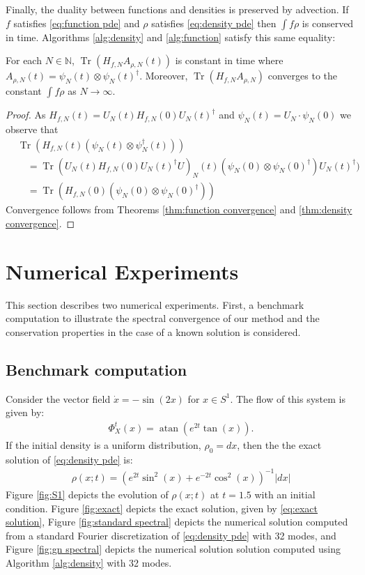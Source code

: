 \documentclass[final,leqno]{siamart}
\DeclareMathOperator{\Tr}{Tr}
\begin{document}
Finally, the duality between functions and densities is preserved by advection.  If $f$ satisfies \eqref{eq:function pde} and $\rho $ satisfies \eqref{eq:density pde} then $\int f \rho$ is conserved in time.
Algorithms \ref{alg:density} and \ref{alg:function} satisfy this same equality:
\begin{theorem}
	For each $N \in \mathbb{N}$, $\Tr( H_{f,N} A_{\rho,N} (t))$ is constant in time where $A_{\rho,N} (t)= \psi_{N}(t) \otimes \psi_{N}(t)^{\dagger}$.
	Moreover, $\Tr( H_{f,N} A_{\rho,N} )$ converges to the constant $\int f\rho $ as $N \to \infty$.
\end{theorem}
\begin{proof}
	As $H_{f,N}(t) = U_{N}(t) H_{f,N}(0) U_{N}(t)^{\dagger}$ and $\psi_{N}(t) = U_{N} \cdot \psi_{N}(0)$ we observe that
	\begin{align*}
		&\Tr( H_{f,N}(t) (\psi_{N} (t) \otimes \psi_{N}^{\dagger} (t) ) ) \\
		&\quad = \Tr(  U_{N}(t) H_{f,N}(0) U_{N}(t)^{\dagger} U)_{N}(t) (\psi_{N}(0) \otimes \psi_{N}(0)^{\dagger}) U_{N}(t)^{\dagger}) \\
		&\quad = \Tr( H_{f,N}(0) ( \psi_{N}(0) \otimes \psi_{N}(0)^{\dagger} ) )
	\end{align*}
	Convergence follows from Theorems \ref{thm:function convergence} and \ref{thm:density convergence}.
\end{proof}


\section{Numerical Experiments} \label{sec:numerics}

This section describes two numerical experiments.  First, a benchmark computation to illustrate the spectral convergence of our method and the conservation properties in the case of a known solution is considered.

\subsection{Benchmark computation}
\label{sec:benchmark}
Consider the vector field $\dot{x} = -\sin(2 x)$ for $x \in S^{1}$.
The flow of this system is given by:
\begin{align*}
	\Phi_{X}^{t}(x) = \operatorname{atan} \left( e^{2t} \tan( x) \right).
\end{align*}
If the initial density is a uniform distribution, $\rho_{0} = dx$, then the the exact solution of \eqref{eq:density pde} is:
\begin{align}
	\rho(x;t) =  \left( e^{2t} \sin^{2}(x) + e^{-2t} \cos^{2}(x) \right)^{-1}  |dx| \label{eq:exact solution}
\end{align}
Figure \ref{fig:S1} depicts the evolution of $\rho(x;t)$ at $t=1.5$ with an initial condition.
Figure \ref{fig:exact} depicts the exact solution, given by \eqref{eq:exact solution},  Figure \ref{fig:standard spectral} depicts the numerical solution computed from a standard Fourier discretization of \eqref{eq:density pde} with 32 modes, and Figure \ref{fig:gn spectral} depicts the numerical solution solution computed using Algorithm \ref{alg:density} with 32 modes.
\end{document}

